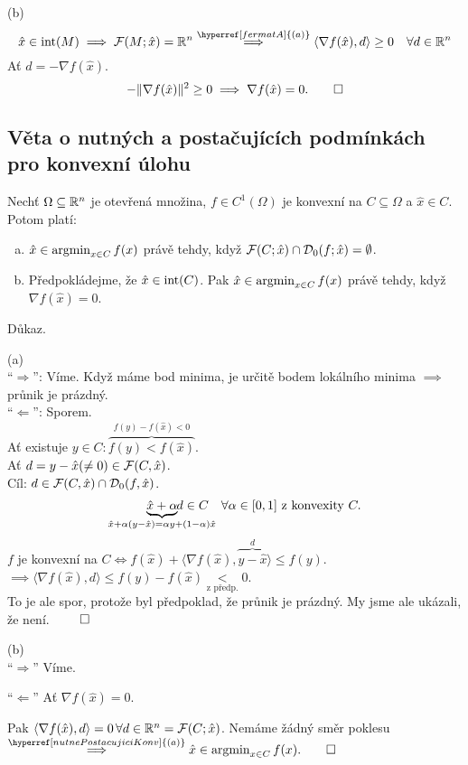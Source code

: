 (b)
\[
    \hat x \in \Int(M) \implies \F(M; \hat x) = \R^n \overset{\hyperref[fermatA]{(a)}}{\implies}
    \langle \nabla f(\hat x), d\rangle \geq 0 \quad \forall d \in \R^n
\]
Ať $d = - \nabla f (\hat x)$.
\[
    - \| \nabla f(\hat x)\|^2 \geq 0 \implies \nabla f(\hat x) = 0. \qed
\]
\newpage
\subsection{Věta o nutných a postačujících podmínkách pro konvexní úlohu}\label{nutnePostacujiciKonv}
Nechť $\Omega \subseteq \mathbb{R}^n$ je otevřená množina, $f \in C^1 (\Omega)$ je konvexní na $C \subseteq \Omega$ a
$\hat x \in C$. Potom platí:
\begin{enumerate}[(a)]
    \item $\hat x \in \operatorname*{argmin}_{x \in C} f(x)$ právě tehdy, když $\mathcal{F}(C; \hat x) \cap \mathcal{D}_0(f; \hat x) = \emptyset$.
    \item Předpokládejme, že $\hat x \in \operatorname*{int}(C)$. Pak $\hat x \in \operatorname*{argmin}_{x \in C}f(x)$ právě tehdy, když
    $\nabla f(\hat x) = 0$.
\end{enumerate}
Důkaz.

(a)\\
\enquote{$\Rightarrow$}: Víme. Když máme bod minima, je určitě bodem lokálního minima $\implies$ průnik je prázdný.\\
\enquote{$\Leftarrow$}: Sporem.\\
Ať existuje $y \in C : \overbrace{f(y) < f(\hat x)}^{f(y) - f(\hat x) < 0}$.\\
Ať $d = y - \hat x (\not = 0) \in \mathcal{F}(C, \hat x)$.\\
Cíl: $d \in \mathcal{F}(C, \hat x) \cap \mathcal{D}_0(f, \hat x)$.
\[
    \underbrace{\hat x + \alpha}_{\hat x + \alpha (y- \hat x) = \alpha y + 
    (1-\alpha) \hat x} \hspace*{-11.5mm}d \in C \quad \forall \alpha \in [0, 1] \text{ z konvexity } C.
\]
$f$ je konvexní na $C \iff f(\hat x) + \langle \nabla f(\hat x), \overbrace{y - \hat x}^{d}\rangle \leq f(y)$.
$\implies \langle \nabla f(\hat x), d\rangle \leq f(y) - f(\hat x) \underset{\text{z předp.}}{<} 0$.\\
To je ale spor, protože byl předpoklad, že průnik je prázdný. My jsme ale ukázali, že není. $\qed$

(b)\\
\enquote{$\Rightarrow$} Víme.

\enquote{$\Leftarrow$} Ať $\nabla f(\hat x) = 0$.

Pak $\langle \nabla f(\hat x), d\rangle = 0 \, \forall d \in \mathbb{R}^n = \mathcal{F} (C; \hat x)$. Nemáme žádný směr poklesu
$\overset{\hyperref[nutnePostacujiciKonv]{(a)}}{\implies} \hat x \in \argmin_{x \in C} f(x).\qed$

